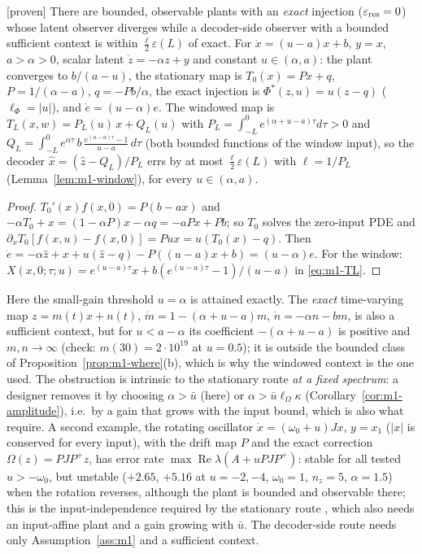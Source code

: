\begin{proposition}\label{prop:m1-tight}
[proven] There are bounded, observable plants with an \emph{exact} injection ($\varepsilon_{\rm res}=0$) whose latent
observer diverges while a decoder-side observer with a bounded sufficient context is within $\tfrac{\ell}{2}\varepsilon(L)$
of exact. For $\dot x=(u-a)x+b$, $y=x$, $a>\alpha>0$, scalar latent $\dot z=-\alpha z+y$ and constant $u\in(\alpha,a)$:
the plant converges to $b/(a-u)$, the stationary map is $T_0(x)=Px+q$, $P=1/(\alpha-a)$, $q=-Pb/\alpha$, the exact
injection is $\Phi^*(z,u)=u(z-q)$ ($\ell_\Phi=|u|$), and $\dot e=(u-\alpha)e$. The windowed map is
$T_L(x,w)=P_L(u)\,x+Q_L(u)$ with $P_L=\int_{-L}^0e^{(\alpha+u-a)\tau}d\tau>0$ and
$Q_L=\int_{-L}^0e^{\alpha\tau}\,b\,\tfrac{e^{(u-a)\tau}-1}{u-a}\,d\tau$ (both bounded functions of the window input), so the
decoder $\hat x=(\hat z-Q_L)/P_L$ errs by at most $\tfrac{\ell}{2}\varepsilon(L)$ with $\ell=1/P_L$
(Lemma~\ref{lem:m1-window}), for every $u\in(\alpha,a)$.
\end{proposition}
\begin{proof}
$T_0'(x)f(x,0)=P(b-ax)$ and $-\alpha T_0+x=(1-\alpha P)x-\alpha q=-aPx+Pb$; so $T_0$ solves the zero-input PDE and
$\partial_xT_0[f(x,u)-f(x,0)]=Pux=u(T_0(x)-q)$. Then $\dot e=-\alpha\hat z+x+u(\hat z-q)-P((u-a)x+b)=(u-\alpha)e$.
For the window: $X(x,0;\tau;u)=e^{(u-a)\tau}x+b(e^{(u-a)\tau}-1)/(u-a)$ in \eqref{eq:m1-TL}.
\end{proof}
\noindent Here the small-gain threshold $u=\alpha$ is attained exactly. The \emph{exact} time-varying map $z=m(t)x+n(t)$,
$\dot m=1-(\alpha+u-a)m$, $\dot n=-\alpha n-bm$, is also a sufficient context, but for $u<a-\alpha$ its coefficient
$-(\alpha+u-a)$ is positive and $m,n\to\infty$ (check: $m(30)=2\cdot10^{19}$ at $u=0.5$); it is outside the bounded
class of Proposition~\ref{prop:m1-where}(b), which is why the windowed context is the one used. The obstruction is
intrinsic to the stationary route \emph{at a fixed spectrum}: a designer removes it by choosing $\alpha>\bar u$ (here) or
$\alpha>\bar u\ell_\Omega\kappa$ (Corollary~\ref{cor:m1-amplitude}), i.e.\ by a gain that grows with the input bound, which
is also what \citet[Theorem~4]{bernard2019luenberger} require. A second example, the rotating oscillator
$\dot x=(\omega_0+u)Jx$, $y=x_1$ ($|x|$ is conserved for every input), with the drift map $P$ and the exact correction
$\Omega(z)=PJP^+z$, has error rate $\max\operatorname{Re}\lambda(A+uPJP^+)$: stable for all tested $u>-\omega_0$, but
unstable ($+2.65$, $+5.16$ at $u=-2,-4$, $\omega_0=1$, $n_z=5$, $\alpha=1.5$) when the rotation reverses, although the
plant is bounded and observable there; this is the input-independence required by the stationary route
\citep[Theorem~4]{bernard2019luenberger}, which also needs an input-affine plant and a gain growing with $\bar u$.
The decoder-side route needs only Assumption~\ref{ass:m1} and a sufficient context.

